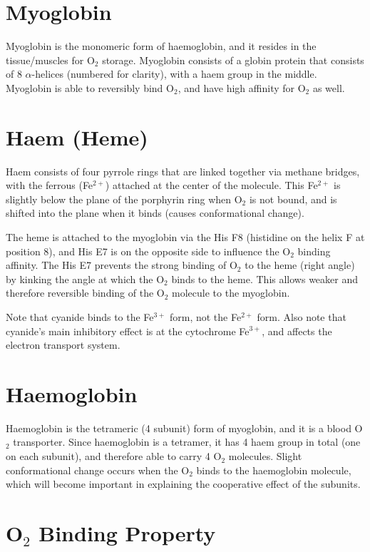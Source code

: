 \section{Myoglobin}

Myoglobin is the monomeric form of haemoglobin, and it resides in the tissue/muscles for O$_2$ storage.
Myoglobin consists of a globin protein that consists of 8 $\alpha$-helices (numbered for clarity), with a haem group in the middle.
Myoglobin is able to reversibly bind O$_2$, and have high affinity for O$_2$ as well.

\section{Haem (Heme)}

Haem consists of four pyrrole rings that are linked together via methane bridges, with the ferrous (Fe$^{2+}$) attached at the center of the molecule.
This Fe$^{2+}$ is slightly below the plane of the porphyrin ring when O$_2$ is not bound, and is shifted into the plane when it binds (causes conformational change).

The heme is attached to the myoglobin via the His F8 (histidine on the helix F at position 8), and His E7 is on the opposite side to influence the O$_2$ binding affinity.
The His E7 prevents the strong binding of O$_2$ to the heme (right angle) by kinking the angle at which the O$_2$ binds to the heme.
This allows weaker and therefore reversible binding of the O$_2$ molecule to the myoglobin.

Note that cyanide binds to the Fe$^{3+}$ form, not the Fe$^{2+}$ form.
Also note that cyanide's main inhibitory effect is at the cytochrome Fe$^{3+}$, and affects the electron transport system.

\section{Haemoglobin}

Haemoglobin is the tetrameric (4 subunit) form of myoglobin, and it is a blood O$_2$ transporter.
Since haemoglobin is a tetramer, it has 4 haem group in total (one on each subunit), and therefore able to carry 4 O$_2$ molecules.
Slight conformational change occurs when the O$_2$ binds to the haemoglobin molecule, which will become important in explaining the cooperative effect of the subunits.

\section{O$_2$ Binding Property}


